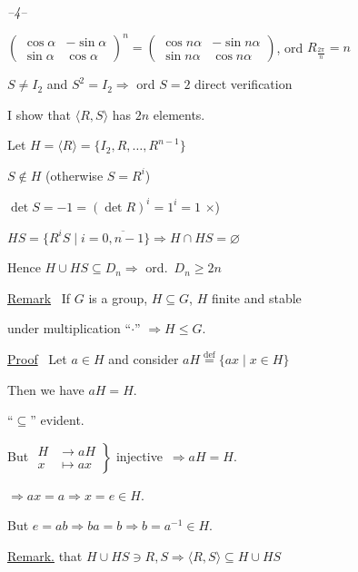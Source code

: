 \documentclass[12pt]{article}
\begin{document}
\begin{center}
\textit{--4--}
\end{center}

\noindent{} \quad $\begin{pmatrix}\cos\alpha & -\sin\alpha\\ \sin\alpha & \cos\alpha\end{pmatrix}^{\!n} = \begin{pmatrix}\cos n\alpha & -\sin n\alpha\\ \sin n\alpha & \cos n\alpha\end{pmatrix}$, \quad ord $R_{\frac{2\pi}{n}} = n$

\bigskip
\noindent $S\neq I_2$ and $S^2=I_2 \Rightarrow$ ord $S=2$ \hfill direct verification

\bigskip
\bigskip
\noindent I show that $\langle R,S\rangle$ has $2n$ elements.

\noindent Let $H=\langle R\rangle = \{I_2,R,\ldots,R^{n-1}\}$

\noindent $S\notin H$ (otherwise $S=R^i$)

\noindent $\det S = -1 = (\det R)^i = 1^i = 1$ \quad $\times$)

\bigskip
\noindent $HS = \{R^iS \mid i=\overline{0,n-1}\} \Rightarrow H\cap HS=\varnothing$

\noindent Hence $H\cup HS \subseteq D_n \Rightarrow$ ord.\ $D_n\geq 2n$

\bigskip
\noindent\underline{Remark} \ If $G$ is a group, $H\subseteq G$, $H$ finite and stable

\noindent under multiplication ``$\cdot$'' $\Rightarrow H\leq G$.

\bigskip
\noindent\underline{Proof} \ Let $a\in H$ and consider $aH \overset{\text{def}}{=} \{ax \mid x\in H\}$

\noindent Then we have $aH=H$.

\noindent ``$\subseteq$'' evident.

\bigskip
\noindent But $\left.\begin{aligned} H&\to aH\\ x&\mapsto ax \end{aligned}\right\}$ injective\ $\Rightarrow aH=H$.

\bigskip
\noindent $\Rightarrow ax=a \Rightarrow x=e\in H.$

\noindent But $e=ab \Rightarrow ba=b \Rightarrow b=a^{-1}\in H.$

\bigskip
\noindent\underline{Remark.} that $H\cup HS \ni R,S \Rightarrow \langle R,S\rangle \subseteq H\cup HS$
\end{document}
